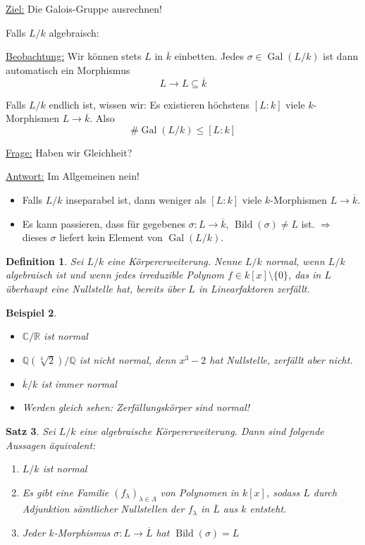 \documentclass[a4paper,12pt,numbers=noenddot,parskip=full]{scrartcl}
\newcommand{\setQ}{\mathbb{Q}}
\newcommand{\setR}{\mathbb{R}}
\newcommand{\setC}{\mathbb{C}}
\newcommand{\heading}{\underline}
\DeclareMathOperator{\Gal}{Gal}
\theoremstyle{dotless}
\newtheorem{theorem}{Satz}[section]
\newtheorem{definition}[theorem]{Definition}
\newtheorem{example}[theorem]{Beispiel}
\theoremstyle{remark}
\begin{document}
	\heading{Ziel:} Die Galois-Gruppe ausrechnen!
	
	Falls $L/k$ algebraisch:
	
	\heading{Beobachtung:} Wir können stets $L$ in $\overline{k}$ einbetten. Jedes $\sigma \in \Gal(L/k)$ ist dann automatisch ein Morphismus
	\begin{equation*}
		L \to L \subseteq \overline{k}
	\end{equation*}
	
	Falls $L/k$ endlich ist, wissen wir: Es existieren höchstens $[L:k]$ viele $k$-Morphismen $L \to \overline{k}$. Also
	\begin{equation}
		\#\Gal(L/k) \leq [L:k]
	\end{equation}
	
	\heading{Frage:} Haben wir Gleichheit?
	
	\heading{Antwort:} Im Allgemeinen nein!
	\begin{itemize}
		\item Falls $L/k$ inseparabel ist, dann weniger als $[L:k]$ viele $k$-Morphismen $L \to \overline{k}$.
		\item Es kann passieren, dass für gegebenes $\sigma: L \to \overline{k}$, $\operatorname{Bild}(\sigma) \neq L$ ist. $\Rightarrow$ dieses $\sigma$ liefert kein Element von $\Gal(L/k)$.
	\end{itemize}

	\begin{definition}
		Sei $L/k$ eine Körpererweiterung. Nenne $L/k$ normal, wenn $L/k$ algebraisch ist und wenn jedes irreduzible Polynom $f \in k[x] \setminus \{ 0 \}$, das in $L$ überhaupt eine Nullstelle hat, bereits über $L$ in Linearfaktoren zerfällt.
	\end{definition}

	\begin{example}
		\begin{itemize}
			\item $\setC/\setR$ ist normal
			\item $\setQ(\sqrt[3]{2})/\setQ$ ist nicht normal, denn $x^3 - 2$ hat Nullstelle, zerfällt aber nicht.
			\item $\overline{k}/k$ ist immer normal
			\item Werden gleich sehen: Zerfällungskörper sind normal!
		\end{itemize}
	\end{example}

	\begin{theorem}
		Sei $L/k$ eine algebraische Körpererweiterung. Dann sind folgende Aussagen äquivalent:
		\begin{enumerate}
			\item $L/k$ ist normal
			\item Es gibt eine Familie $(f_\lambda)_{\lambda \in \Lambda}$ von Polynomen in $k[x]$, sodass $L$ durch Adjunktion sämtlicher Nullstellen der $f_\lambda$ in $\overline{L}$ aus $k$ entsteht.
			\item Jeder $k$-Morphismus $\sigma: L \to \overline{L}$ hat $\operatorname{Bild}(\sigma) = L$
		\end{enumerate}
	\end{theorem}
\end{document}
